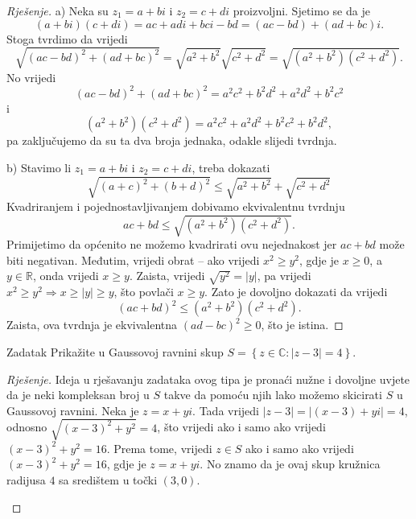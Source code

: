 \begin{proof}[Rješenje]
a) Neka su \(z_1=a+bi\) i \(z_2=c+di\) proizvoljni. Sjetimo se da je \[(a+bi)(c+di)=ac+adi+bci-bd=(ac-bd)+(ad+bc)i.\] Stoga tvrdimo da vrijedi
\[\sqrt{(ac-bd)^2+(ad+bc)^2}=\sqrt{a^2+b^2}\sqrt{c^2+d^2}=\sqrt{(a^2+b^2)(c^2+d^2)}.\]
No vrijedi \[(ac-bd)^2+(ad+bc)^2=a^2c^2+b^2d^2+a^2d^2+b^2c^2\] 
i 
\[(a^2+b^2)(c^2+d^2)=a^2c^2+a^2d^2+b^2c^2+b^2d^2,\] pa zaključujemo da su ta dva broja jednaka, odakle slijedi tvrdnja.

b) Stavimo li \(z_1=a+bi\) i \(z_2=c+di\), treba dokazati
\[\sqrt{(a+c)^2+(b+d)^2}\leq \sqrt{a^2+b^2}+\sqrt{c^2+d^2}\]
Kvadriranjem i pojednostavljivanjem dobivamo ekvivalentnu tvrdnju
\[ac+bd\leq \sqrt{(a^2+b^2)(c^2+d^2)}.\]
Primijetimo da općenito ne možemo kvadrirati ovu nejednakost jer \(ac+bd\) može biti negativan. Međutim, vrijedi obrat -- ako vrijedi \(x^2\geq y^2\), gdje je \(x\geq 0\), a \(y\in \mathbb{R}\), onda vrijedi \(x\geq y\). Zaista, vrijedi \(\sqrt{y^2}=\left\lvert y\right\rvert\), pa vrijedi \(x^2\geq y^2\Rightarrow x\geq |y|\geq y\), što povlači \(x\geq y\). Zato je dovoljno dokazati da vrijedi
\[(ac+bd)^2\leq (a^2+b^2)(c^2+d^2).\]
Zaista, ova tvrdnja je ekvivalentna \((ad-bc)^2\geq 0\), što je istina.
\end{proof}
\begin{exercise}{Zadatak}
Prikažite u Gaussovoj ravnini skup \(S=\left\{z\in \mathbb{C} : \left\lvert z-3\right\rvert=4\right\}\).
\end{exercise}
\begin{proof}[Rješenje]
Ideja u rješavanju zadataka ovog tipa je pronaći nužne i dovoljne uvjete da je neki kompleksan broj u \(S\) takve da pomoću njih lako možemo skicirati \(S\) u Gaussovoj ravnini. Neka je \(z=x+yi\). Tada vrijedi \(|z-3|=|(x-3)+yi|=4\), odnosno \(\sqrt{(x-3)^2+y^2}=4\), što vrijedi ako i samo ako vrijedi \((x-3)^2+y^2=16\). Prema tome, vrijedi \(z\in S\) ako i samo ako vrijedi \((x-3)^2+y^2=16\), gdje je \(z=x+yi\). No znamo da je ovaj skup kružnica radijusa \(4\) sa središtem u točki \((3, 0)\).
\newpage
\begin{figure}[ht]
\begin{center}
\end{center}
\end{figure}
\end{proof}
